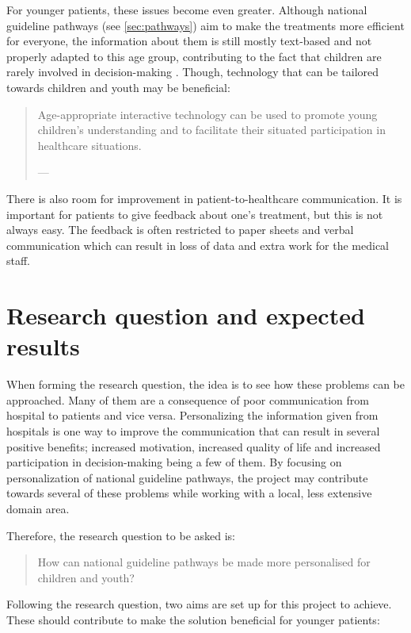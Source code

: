 For younger patients, these issues become even greater. Although national guideline pathways (see \autoref{sec:pathways}) aim to make the treatments more efficient for everyone, the information about them is still mostly text-based and not properly adapted to this age group, contributing to the fact that children are rarely involved in decision-making \autocite{coyne2008}. Though, technology that can be tailored towards children and youth may be beneficial:

\begin{quote}
    Age-appropriate interactive technology can be used to promote young children’s understanding and to facilitate their situated participation in healthcare situations.

    \raggedleft--- \textcite{stalberg2018}
\end{quote}

There is also room for improvement in patient-to-healthcare communication. It is important for patients to give feedback about one's treatment, but this is not always easy. The feedback is often restricted to paper sheets and verbal communication which can result in loss of data and extra work for the medical staff.

\section{Research question and expected results}
\label{sec:researchquestion}

When forming the research question, the idea is to see how these problems can be approached. Many of them are a consequence of poor communication from hospital to patients and vice versa. Personalizing the information given from hospitals is one way to improve the communication that can result in several positive benefits; increased motivation, increased quality of life and increased participation in decision-making being a few of them. By focusing on personalization of national guideline pathways, the project may contribute towards several of these problems while working with a local, less extensive domain area.

Therefore, the research question to be asked is:

\begin{quote}
    How can national guideline pathways be made more personalised for children and youth?
\end{quote}

Following the research question, two aims are set up for this project to achieve. These should contribute to make the solution beneficial for younger patients:

